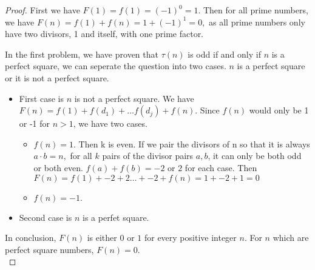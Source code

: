 \documentclass[11pt,a4paper]{article}
\begin{document}
\begin{enumerate}
	\begin{proof}
		First we have $F(1) = f(1) = (-1)^0 = 1$. Then for all prime numbers, we have $F(n) = f(1) + f(n) = 1 + (-1)^1 = 0,$ as all prime numbers only have two divisors, 1 and itself, with one prime factor.

		In the first problem, we have proven that \(\tau(n)\) is odd if and only if \(n\) is a perfect square, we can seperate the question into two cases. $n$ is a perfect square or it is not a perfect square.
		\begin{itemize}
			\item First case is $n$ is not a perfect square. We have $F(n) = f(1) + f(d_1) + \ldots f(d_j) + f(n).$ Since $f(n)$ would only be 1 or -1 for $n>1$, we have two cases.
				\begin{itemize}
					\item $f(n) = 1.$ Then k is even. If we pair the divisors of n so that it is always $a\cdot b = n,$ for all $k$ pairs of the divisor pairs $a, b$, it can only be both odd or both even. $f(a)+f(b) = -2$ or $2$ for each case. Then $F(n) = f(1) + -2 + 2 \ldots + -2 + f(n) = 1 + -2 + 1 =0$
					\item $f(n) = -1.$
				\end{itemize}
			\item Second case is $n$ is a perfet square.
		\end{itemize}
		In conclusion, \(F(n)\) is either \(0\) or \(1\) for every positive integer \(n\). For $n$ which are perfect square numbers, \(F(n) = 0\).\\
	\end{proof}






\end{enumerate}
\end{document}
